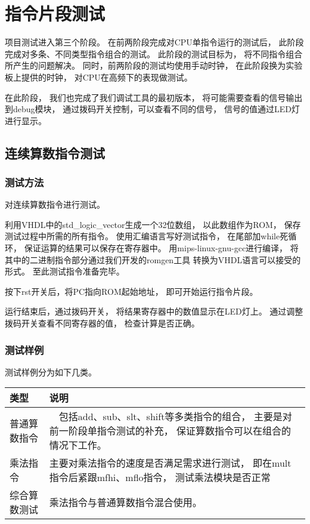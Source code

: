\section{指令片段测试}

    项目测试进入第三个阶段。%
    在前两阶段完成对CPU单指令运行的测试后，%
    此阶段完成对多条、不同类型指令组合的测试。%
    此阶段的测试目标为，%
    将不同指令组合所产生的问题解决。%
    同时，前两阶段的测试均使用手动时钟，%
    在此阶段换为实验板上提供的时钟，%
    对CPU在高频下的表现做测试。

    在此阶段，%
    我们也完成了我们调试工具的最初版本，%
    将可能需要查看的信号输出到debug模块，%
    通过拨码开关控制，可以查看不同的信号，%
    信号的值通过LED灯进行显示。

    \subsection{连续算数指令测试}
        \subsubsection{测试方法}
            对连续算数指令进行测试。%

            利用VHDL中的std\_logic\_vector生成一个32位数组，%
            以此数组作为ROM，%
            保存测试过程中所需的所有指令。%
            使用汇编语言写好测试指令，%
            在尾部加while死循环，%
            保证运算的结果可以保存在寄存器中。%
            用mips-linux-gnu-gcc进行编译，%
            将其中的二进制指令部分通过我们开发的romgen工具%
            转换为VHDL语言可以接受的形式。%
            至此测试指令准备完毕。

            按下rst开关后，将PC指向ROM起始地址，%
            即可开始运行指令片段。%

            运行结束后，通过拨码开关，%
            将结果寄存器中的数值显示在LED灯上。%
            通过调整拨码开关查看不同寄存器的值，%
            检查计算是否正确。

        \subsubsection{测试样例}
            测试样例分为如下几类。
            \begin{table}[!hbp]
            \centering
            \begin{tabularx}{\textwidth}{|l|X|}
            \hline
            类型 & 说明 \\
            \hline
            普通算数指令 &　包括add、sub、slt、shift等多类指令的组合，%
                        主要是对前一阶段单指令测试的补充，%
                        保证算数指令可以在组合的情况下工作。  \\
            \hline
            乘法指令 & 主要对乘法指令的速度是否满足需求进行测试，%
                        即在mult指令后紧跟mfhi、mflo指令，%
                        测试乘法模块是否正常  \\
            \hline
            综合算数测试 & 乘法指令与普通算数指令混合使用。 \\
            \hline
            \end{tabularx}
            \end{table}

